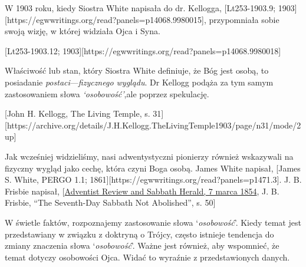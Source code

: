 W 1903 roku, kiedy Siostra White napisała do dr. Kellogga, [Lt253-1903.9; 1903][https://egwwritings.org/read?panels=p14068.9980015], przypomniała sobie swoją wizję, w której widziała Ojca i Syna.

[Lt253-1903.12; 1903][https://egwwritings.org/read?panels=p14068.9980018]





Właściwość lub stan, który Siostra White definiuje, że Bóg jest osobą, to posiadanie \textit{postaci}—\textit{fizycznego wyglądu}. Dr Kellogg podąża za tym samym zastosowaniem słowa \textit{‘osobowość’},ale poprzez spekulację.

[John H. Kellogg, The Living Temple, s. 31][https://archive.org/details/J.H.Kellogg.TheLivingTemple1903/page/n31/mode/2up]

Jak wcześniej widzieliśmy, nasi adwentystyczni pionierzy również wskazywali na fizyczny wygląd jako cechę, która czyni Boga osobą. James White napisał, [James S. White, PERGO 1.1; 1861][https://egwwritings.org/read?panels=p1471.3]. J. B. Frisbie napisał, [\href{https://documents.adventistarchives.org/Periodicals/RH/RH18540307-V05-07.pdf}{Adventist Review and Sabbath Herald, 7 marca 1854}, J. B. Frisbie, “The Seventh-Day Sabbath Not Abolished”, s. 50]

W świetle faktów, rozpoznajemy zastosowanie słowa ‘\textit{osobowość}’. Kiedy temat  jest przedstawiany w związku z doktryną o Trójcy, często istnieje tendencja do zmiany znaczenia słowa ‘\textit{osobowość}’. Ważne jest również, aby wspomnieć, że temat  dotyczy osobowości Ojca. Widać to wyraźnie  z przedstawionych danych.

